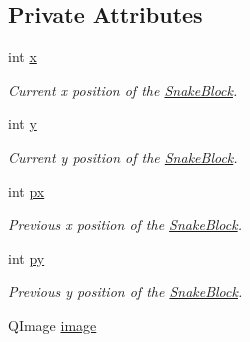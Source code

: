 \subsection*{\-Private \-Attributes}
\begin{DoxyCompactItemize}
\item 
\hypertarget{classSnakeBlock_ae4bcb05c48c77bff73282652a5f91b42}{int \hyperlink{classSnakeBlock_ae4bcb05c48c77bff73282652a5f91b42}{x}}\label{classSnakeBlock_ae4bcb05c48c77bff73282652a5f91b42}

\begin{DoxyCompactList}\small\item\em \-Current x position of the \hyperlink{classSnakeBlock}{\-Snake\-Block}. \end{DoxyCompactList}\item 
\hypertarget{classSnakeBlock_a25b60c36f8e84c5af37bdf48a078fec0}{int \hyperlink{classSnakeBlock_a25b60c36f8e84c5af37bdf48a078fec0}{y}}\label{classSnakeBlock_a25b60c36f8e84c5af37bdf48a078fec0}

\begin{DoxyCompactList}\small\item\em \-Current y position of the \hyperlink{classSnakeBlock}{\-Snake\-Block}. \end{DoxyCompactList}\item 
\hypertarget{classSnakeBlock_a9d70e8dce83da65a6e4da496ad016b5c}{int \hyperlink{classSnakeBlock_a9d70e8dce83da65a6e4da496ad016b5c}{px}}\label{classSnakeBlock_a9d70e8dce83da65a6e4da496ad016b5c}

\begin{DoxyCompactList}\small\item\em \-Previous x position of the \hyperlink{classSnakeBlock}{\-Snake\-Block}. \end{DoxyCompactList}\item 
\hypertarget{classSnakeBlock_a85c5ad23c6297acf264ce5e5ca65ad69}{int \hyperlink{classSnakeBlock_a85c5ad23c6297acf264ce5e5ca65ad69}{py}}\label{classSnakeBlock_a85c5ad23c6297acf264ce5e5ca65ad69}

\begin{DoxyCompactList}\small\item\em \-Previous y position of the \hyperlink{classSnakeBlock}{\-Snake\-Block}. \end{DoxyCompactList}\item 
\hypertarget{classSnakeBlock_ad787df4e44374b9a5532128c497c16ff}{\-Q\-Image \hyperlink{classSnakeBlock_ad787df4e44374b9a5532128c497c16ff}{image}}\label{classSnakeBlock_ad787df4e44374b9a5532128c497c16ff}


\end{DoxyCompactItemize}
